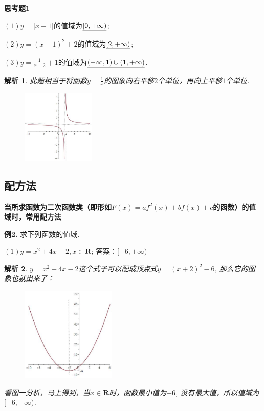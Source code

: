 \documentclass{article}
\theoremstyle{plain}
\newtheorem{aly}{解析}
\begin{document}
\textbf{思考题1}

$(1) y=|x-1|$的值域为$\uline{[0,+\infty)}$;

$(2) y=(x-1)^2+2$的值域为$\uline{[2,+\infty)}$;

$(3) y=\frac{1}{x-2}+1$的值域为$\uline{(-\infty,1)\cup(1,+\infty)}$.

\begin{aly}
  此题相当于将函数$y=\frac{1}{x}$的图象向右平移$2$个单位，再向上平移$1$个单位.
\begin{figure}[h]
  \centering
  \includegraphics[width=3.5cm]{1-1-3.jpg}\label{1-1-3}
\end{figure}
\end{aly}


\subsection{配方法}
\textbf{当所求函数为二次函数类（即形如$F(x)=af^2(x)+bf(x)+c$的函数）的值域时，常用配方法}

\textbf{例2.} 求下列函数的值域.

$(1) y=x^2+4x-2, x\in \mathbf{R}$; \hspace{25pt} 答案：$[-6,+\infty)$
\begin{aly}
  $y=x^2+4x-2$这个式子可以配成\emph{顶点式}$y=(x+2)^2-6$, 那么它的图象也就出来了：
\begin{figure}[h]
  \centering
  \includegraphics[width=4.5cm]{2-1.jpg}\label{2-1}
\end{figure}

看图一分析，马上得到，当$x\in \mathbf{R}$时，函数最小值为$-6$, 没有最大值，所以值域为$[-6,+\infty)$.
\end{aly}
\end{document}
